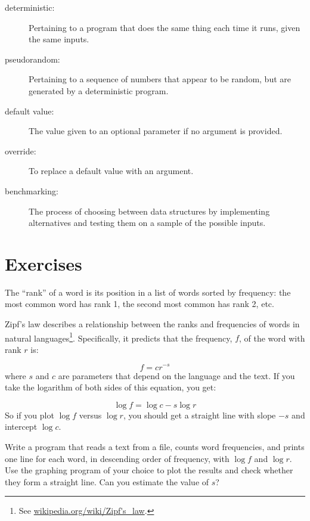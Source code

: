 \documentclass[10pt]{book}
\begin{document}
\begin{description}

\item[deterministic:] Pertaining to a program that does the same
thing each time it runs, given the same inputs.

\item[pseudorandom:] Pertaining to a sequence of numbers that appear
to be random, but are generated by a deterministic program.

\item[default value:] The value given to an optional parameter if no
argument is provided.

\item[override:] To replace a default value with an argument.

\item[benchmarking:] The process of choosing between data structures
by implementing alternatives and testing them on a sample of the
possible inputs.  

\end{description}

\section{Exercises}

\begin{ex}


The ``rank'' of a word is its position in a list of words
sorted by frequency: the most common word has rank 1, the
second most common has rank 2, etc.

Zipf's law describes a relationship between the ranks and frequencies
of words in natural languages\footnote{See
  \url{wikipedia.org/wiki/Zipf's_law}.}.  Specifically, it
predicts that the frequency, $f$, of the word with rank $r$ is:

\[ f = c r^{-s} \]
%
where $s$ and $c$ are parameters that depend on the language and the
text.  If you take the logarithm of both sides of this equation, you
get:


\[ \log f = \log c - s \log r \]
%
So if you plot $\log f$ versus $\log r$, you should get
a straight line with slope $-s$ and intercept $\log c$.

Write a program that reads a text from a file, counts
word frequencies, and prints one line
for each word, in descending order of frequency, with
$\log f$ and $\log r$.  Use the graphing program of your
choice to plot the results and check whether they form
a straight line.  Can you estimate the value of $s$?
\end{ex}
\end{document}
